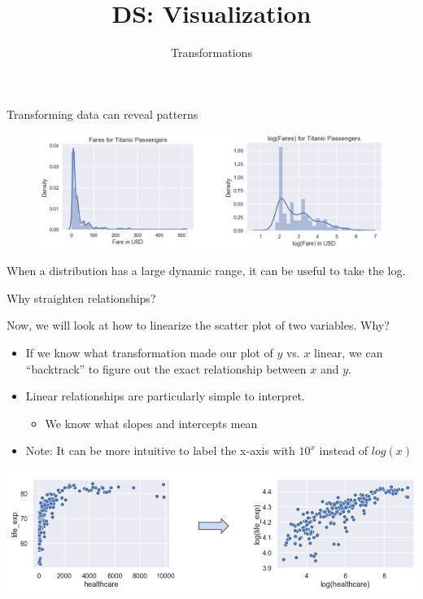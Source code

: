 \documentclass[aspectratio=169]{../latex_main/tntbeamer}  %
\title[Visualization]{DS: Visualization}
\subtitle{Transformations}
\begin{document}
	
	\maketitle
	\begin{frame}{Transforming data can reveal patterns}
	    \begin{figure}
	        \centering
	        \includegraphics[scale=.43]{Bild94}
	    \end{figure}
	    When a distribution has a large dynamic range, it can be useful to take the log.
	\end{frame}
	
	
	\begin{frame}{Why straighten relationships?}

            \vspace*{-1em}
	   Now, we will look at how to linearize the scatter plot of two variables. Why?
	   \begin{itemize}
	       \item If we know what transformation made our plot of $y$ vs. $x$ linear, we can “backtrack” to figure out the exact relationship between $x$ and $y$.
	       \item Linear relationships are particularly simple to interpret.
	       \begin{itemize}
	           \item We know what slopes and intercepts mean
	       \end{itemize}
        \item Note: It can be more intuitive to label the x-axis with $10^x$ instead of $log(x)$
	   \end{itemize}
	        \includegraphics[scale=.43]{Bild95}
	\end{frame}
	
\end{document}
